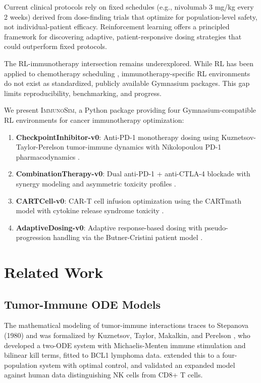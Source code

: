 \documentclass[11pt,a4paper]{article}
\begin{document}
Current clinical protocols rely on fixed schedules (e.g., nivolumab 3 mg/kg every 2 weeks) derived from dose-finding trials that optimize for population-level safety, not individual-patient efficacy. Reinforcement learning offers a principled framework for discovering adaptive, patient-responsive dosing strategies that could outperform fixed protocols.

The RL-immunotherapy intersection remains underexplored. While RL has been applied to chemotherapy scheduling \citep{Eastman2021, Engelhart2011}, immunotherapy-specific RL environments do not exist as standardized, publicly available Gymnasium packages. This gap limits reproducibility, benchmarking, and progress.

We present \textsc{ImmunoSim}, a Python package providing four Gymnasium-compatible RL environments for cancer immunotherapy optimization:

\begin{enumerate}
    \item \textbf{CheckpointInhibitor-v0}: Anti-PD-1 monotherapy dosing using Kuznetsov-Taylor-Perelson tumor-immune dynamics \citep{Kuznetsov1994} with Nikolopoulou PD-1 pharmacodynamics \citep{Nikolopoulou2018}.
    \item \textbf{CombinationTherapy-v0}: Dual anti-PD-1 + anti-CTLA-4 blockade with synergy modeling \citep{Nikolopoulou2021} and asymmetric toxicity profiles \citep{Shulgin2020}.
    \item \textbf{CARTCell-v0}: CAR-T cell infusion optimization using the CARTmath model \citep{Barros2021} with cytokine release syndrome toxicity \citep{Santurio2025}.
    \item \textbf{AdaptiveDosing-v0}: Adaptive response-based dosing with pseudo-progression handling via the Butner-Cristini patient model \citep{Butner2020}.
\end{enumerate}

\section{Related Work}

\subsection{Tumor-Immune ODE Models}

The mathematical modeling of tumor-immune interactions traces to Stepanova (1980) and was formalized by Kuznetsov, Taylor, Makalkin, and Perelson \citeyearpar{Kuznetsov1994}, who developed a two-ODE system with Michaelis-Menten immune stimulation and bilinear kill terms, fitted to BCL1 lymphoma data. \citet{dePillis2001} extended this to a four-population system with optimal control, and \citet{dePillis2005} validated an expanded model against human data distinguishing NK cells from CD8+ T cells.
\end{document}
